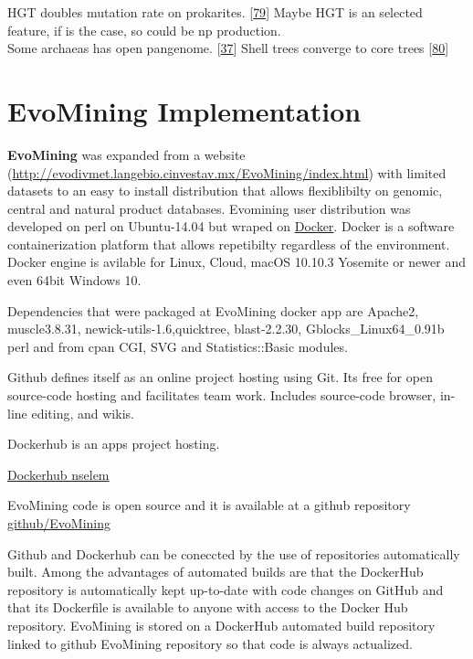 \documentclass[12pt,twoside]{reedthesis}
\begin{document}
  HGT doubles mutation rate on prokarites.
  {[}\protect\hyperlink{ref-kooninux5fturbulentux5f2015}{79}{]} Maybe HGT
  is an selected feature, if is the case, so could be np production.\\
  Some archaeas has open pangenome.
  {[}\protect\hyperlink{ref-halachevux5fcalculatingux5f2011}{37}{]} Shell
  trees converge to core trees
  {[}\protect\hyperlink{ref-narechaniaux5frandomux5f2012}{80}{]}
  
  \section{EvoMining Implementation}\label{evomining-implementation}
  
  \textbf{EvoMining} was expanded from a website
  (\url{http://evodivmet.langebio.cinvestav.mx/EvoMining/index.html}) with
  limited datasets to an easy to install distribution that allows
  flexiblibilty on genomic, central and natural product databases.
  Evomining user distribution was developed on perl on Ubuntu-14.04 but
  wraped on \href{https://www.docker.com/}{Docker}. Docker is a software
  containerization platform that allows repetibilty regardless of the
  environment. Docker engine is avilable for Linux, Cloud, macOS 10.10.3
  Yosemite or newer and even 64bit Windows 10.
  
  Dependencies that were packaged at EvoMining docker app are Apache2,
  muscle3.8.31, newick-utils-1.6,quicktree, blast-2.2.30,
  Gblocks\_Linux64\_0.91b perl and from cpan CGI, SVG and
  Statistics::Basic modules.
  
  Github defines itself as an online project hosting using Git. Its free
  for open source-code hosting and facilitates team work. Includes
  source-code browser, in-line editing, and wikis.
  
  Dockerhub is an apps project hosting.
  
  \href{https://hub.docker.com/u/nselem/}{Dockerhub nselem}
  
  EvoMining code is open source and it is available at a github repository
  \href{https://github.com/nselem/EvoMining}{github/EvoMining}
  
  Github and Dockerhub can be coneccted by the use of repositories
  automatically built. Among the advantages of automated builds are that
  the DockerHub repository is automatically kept up-to-date with code
  changes on GitHub and that its Dockerfile is available to anyone with
  access to the Docker Hub repository. EvoMining is stored on a DockerHub
  automated build repository linked to github EvoMining repository so that
  code is always actualized.
  
\end{document}
